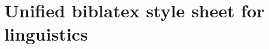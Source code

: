 \documentclass{article}
\begin{document}
\section*{Unified biblatex style sheet for linguistics}

\nocite{*}

\printbibliography[heading=none]
\end{document}
